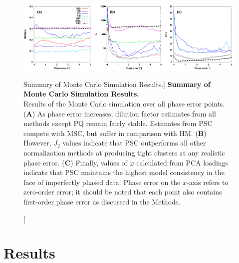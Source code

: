 \begin{figure}[ht!]
\includegraphics[width=6in]{figs/pscorr/04-montecarlo.png}
\caption
      [Summary of Monte Carlo Simulation Results.]{
  {\bf Summary of Monte Carlo Simulation Results.}
  \\
  Results of the Monte Carlo simulation over all phase error points.
  ({\bf A}) As phase error increases, dilution factor estimates from all
  methods except PQ remain fairly stable. Estimates from PSC compete with
  MSC, but suffer in comparison with HM.
  ({\bf B}) However, $J_2$ values indicate that PSC outperforms all other
  normalization methods at producing tight clusters at any realistic
  phase error.
  ({\bf C}) Finally, values of $\varphi$ calculated from PCA loadings indicate
  that PSC maintains the highest model consistency in the face of imperfectly
  phased data. Phase error on the $x$-axis refers to zero-order error; it
  should be noted that each point also contains first-order phase error as
  discussed in the Methods.
}
\label{figure.6.4}
\end{figure}

\section{Results}

